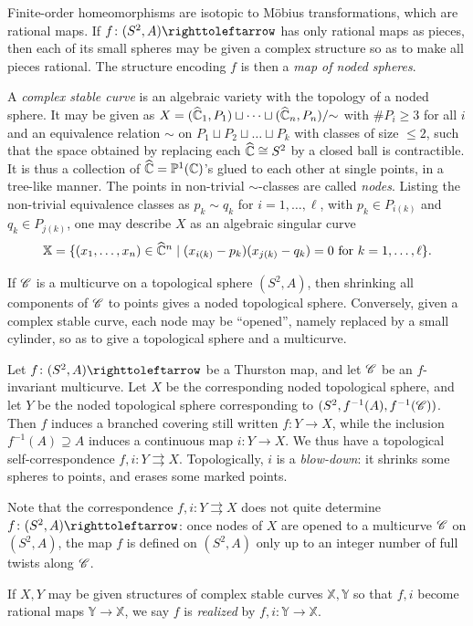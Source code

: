 \documentclass{amsart}
\begin{document}
Finite-order homeomorphisms are isotopic to M\"obius transformations,
which are rational maps. If $f\colon(S^2,A)\selfmap$ has only
rational maps as pieces, then each of its small spheres may be given a
complex structure so as to make all pieces rational. The structure
encoding $f$ is then a \emph{map of noded spheres}.

A \emph{complex stable curve} is an algebraic variety with the
topology of a noded sphere. It may be given as
$X=({\widehat{{\mathbb C}}}_1,P_1)\sqcup\cdots\sqcup({\widehat{{\mathbb C}}}_n,P_n)/{\sim}$ with $\#P_i\ge3$ for
all $i$ and an equivalence relation $\sim$ on $P_1\sqcup P_2\sqcup \dots \sqcup P_k$ with
classes of size $\le2$, such that the space obtained by replacing each
${\widehat{{\mathbb C}}}\cong S^2$ by a closed ball is contractible. It is thus a
collection of ${\widehat{{\mathbb C}}}=\mathbb P^1({\mathbb C})$'s glued to each other at single
points, in a tree-like manner. The points in non-trivial
$\sim$-classes are called \emph{nodes}. Listing the non-trivial
equivalence classes as $p_k\sim q_k$ for $i=1,\dots,\ell$, with
$p_k\in P_{i(k)}$ and $q_k\in P_{j(k)}$, one may describe $X$ as an
algebraic singular curve
\[\mathbb X=\{(x_1,\dots,x_n)\in{\widehat{{\mathbb C}}}^n\mid (x_{i(k)}-p_k)(x_{j(k)}-q_k)=0\text{
  for }k=1,\dots,\ell\}.
\]

If ${\mathscr C}$ is a multicurve on a topological sphere $(S^2,A)$, then
shrinking all components of ${\mathscr C}$ to points gives a noded topological
sphere. Conversely, given a complex stable curve, each node may be
``opened'', namely replaced by a small cylinder, so as to give a
topological sphere and a multicurve.

Let $f\colon(S^2,A)\selfmap$ be a Thurston map, and let ${\mathscr C}$
be an $f$-invariant multicurve. Let $X$ be the corresponding noded
topological sphere, and let $Y$ be the noded topological sphere
corresponding to $(S^2,f^{-1}(A),f^{-1}({\mathscr C}))$. Then $f$ induces a
branched covering still written $f\colon Y\to X$, while the inclusion
$f^{-1}(A)\supseteq A$ induces a continuous map $i\colon Y\to X$. We
thus have a topological self-correspondence
$f,i\colon Y\rightrightarrows X$. Topologically, $i$ is a
\emph{blow-down}: it shrinks some spheres to points, and erases some
marked points.

Note that the correspondence $f,i\colon Y\rightrightarrows X$ does not
quite determine $f\colon(S^2,A)\selfmap$: once nodes of $X$
are opened to a multicurve ${\mathscr C}$ on $(S^2,A)$, the map $f$ is defined
on $(S^2,A)$ only up to an integer number of full twists along ${\mathscr C}$.

If $X,Y$ may be given structures of complex stable curves
$\mathbb X,\mathbb Y$ so that $f,i$ become rational maps
$\mathbb Y\to\mathbb X$, we say $f$ is \emph{realized} by
$f,i\colon\mathbb Y\to\mathbb X$.
\end{document}
